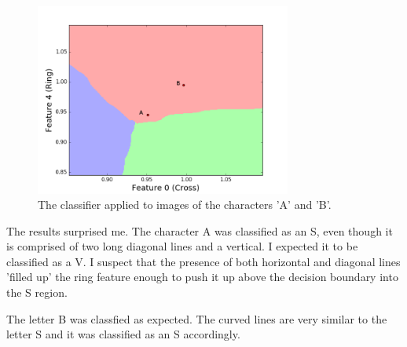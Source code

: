 \documentclass[11pt, a4paper]{article}
\begin{document}
\begin{figure}[h]
	\centering
	\includegraphics[trim={0 0 0 1cm},clip,width=0.75\textwidth]{ab.png}
	\caption{The classifier applied to images of the characters 'A' and 'B'.}
	\label{fig:ab}
\end{figure}

The results surprised me. The character A was classified as an S, even though it is comprised of two long diagonal lines and a vertical. I expected it to be classified as a V. I suspect that the presence of both horizontal and diagonal lines 'filled up' the ring feature enough to push it up above the decision boundary into the S region. 

The letter B was classfied as expected. The curved lines are very similar to the letter S and it was classified as an S accordingly. 
\end{document}
